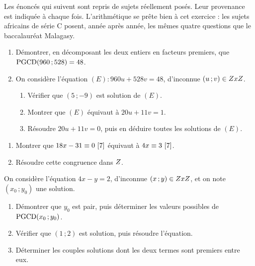 \begin{annales}
Les énoncés qui suivent sont repris de sujets réellement posés. Leur
provenance est indiquée à chaque fois. L'arithmétique se prête bien à cet
exercice : les sujets africains de série C posent, année après année, les
mêmes quatre questions que le baccalauréat Malagasy.

\begin{enumerate}[label=\textbf{\arabic*)}, leftmargin=*, itemsep=0.15em]
  \item Démontrer, en décomposant les deux entiers en facteurs premiers, que
        $\operatorname{PGCD}(960\,;528) = 48$.
  \item On considère l'équation $(E) : 960u+528v = 48$, d'inconnue
        $(u\,;v) \in ZxZ$.
        \begin{enumerate}[label=\textbf{\alph*)}, leftmargin=1.4em]
          \item Vérifier que $(5\,;-9)$ est solution de $(E)$.
          \item Montrer que $(E)$ équivaut à $20u+11v = 1$.
          \item Résoudre $20u+11v = 0$, puis en déduire toutes les solutions
                de $(E)$.
        \end{enumerate}
\end{enumerate}

\begin{enumerate}[label=\textbf{\alph*)}, leftmargin=*, itemsep=0.15em]
  \item Montrer que $18x-31 \equiv 0 \ [7]$ équivaut à $4x \equiv 3 \ [7]$.
  \item Résoudre cette congruence dans $Z$.
\end{enumerate}

On considère l'équation $4x-y = 2$, d'inconnue $(x\,;y) \in ZxZ$, et on
note $(x_{0}\,;y_{0})$ une solution.
\begin{enumerate}[label=\textbf{\arabic*)}, leftmargin=*, itemsep=0.15em]
  \item Démontrer que $y_{0}$ est pair, puis déterminer les valeurs possibles
        de $\operatorname{PGCD}(x_{0}\,;y_{0})$.
  \item Vérifier que $(1\,;2)$ est solution, puis résoudre l'équation.
  \item Déterminer les couples solutions dont les deux termes sont premiers
        entre eux.
\end{enumerate}


\end{annales}
